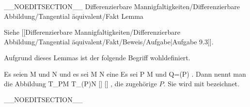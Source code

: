 __NOEDITSECTION__
{Differenzierbare Mannigfaltigkeiten/Differenzierbare Abbildung/Tangential äquivalent/Fakt}
{Lemma}
{}
{

\faktzusatz {}
\faktzusatz {}

 }
{ Siehe [[Differenzierbare Mannigfaltigkeiten/Differenzierbare Abbildung/Tangential äquivalent/Fakt/Beweis/Aufgabe|Aufgabe 9.3]]. }

Aufgrund dieses Lemmas ist der folgende Begriff wohldefiniert.

{}
{

Es seien
\mathkor {} {M} {und} {N} {}
und es sei
\maabbdisp {\varphi} { M } { N
} {}
eine
Es sei
\mathkor {} {P \in M} {und} {Q=\varphi(P)} {.}
Dann nennt man die Abbildung
\maabbeledisp {} {T_PM} {T_{\varphi(P)}N
} { [\gamma] } { [\varphi \circ \gamma]
} {,}
die zugehörige  $P$.  Sie wird mit
 bezeichnet.

}

__NOEDITSECTION__

